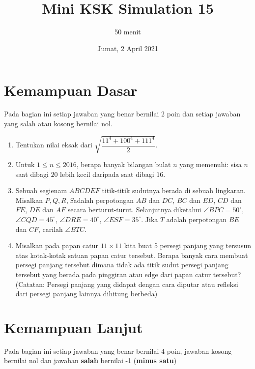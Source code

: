 \documentclass[12pt]{scrartcl}
\title{Mini KSK Simulation 15}
\author{50 menit}
\date{Jumat, 2 April 2021}
\begin{document}
	\maketitle

\renewcommand*\contentsname{Daftar Isi}
\tableofcontents

\newpage
	
	\section{Kemampuan Dasar}
	Pada bagian ini setiap jawaban yang benar bernilai 2 poin dan setiap jawaban yang salah
	atau kosong bernilai nol.
	\begin{enumerate}
		\item Tentukan nilai eksak dari $\sqrt{\dfrac{11^4+100^4+111^4}{2}}$.
		
		\item Untuk $1\leq n\leq 2016$, berapa banyak bilangan bulat $n$ yang memenuhi: sisa $n$ saat dibagi $20$ lebih kecil daripada saat dibagi $16$.
		
		\item Sebuah segienam $ABCDEF$ titik-titik sudutnya berada di sebuah lingkaran. Misalkan $P, Q, R, S$adalah perpotongan $AB$ dan $DC$, $BC$ dan $ED$, $CD$ dan $FE$, $DE$ dan $AF$ secara berturut-turut. Selanjutnya diketahui $\angle BPC=50^{\circ}$, $\angle CQD=45^{\circ}$, $\angle DRE=40^{\circ}$, $\angle ESF=35^{\circ}$.
		Jika $T$ adalah perpotongan $BE$ dan $CF$, carilah $\angle BTC$.
		
		\item Misalkan pada papan catur $11 \times 11$ kita buat 5 persegi panjang yang tersusun atas kotak-kotak satuan papan catur tersebut. Berapa banyak cara membuat persegi panjang tersebut dimana tidak ada titik sudut persegi panjang tersebut yang berada pada pinggiran atau edge dari papan catur tersebut? (Catatan: Persegi panjang yang didapat dengan cara diputar atau refleksi dari persegi panjang lainnya dihitung berbeda)
	\end{enumerate}

\section{Kemampuan Lanjut}
Pada bagian ini setiap jawaban yang benar bernilai 4 poin, jawaban kosong bernilai nol
dan jawaban \textbf{salah} bernilai -1 (\textbf{minus satu})
\end{document}
